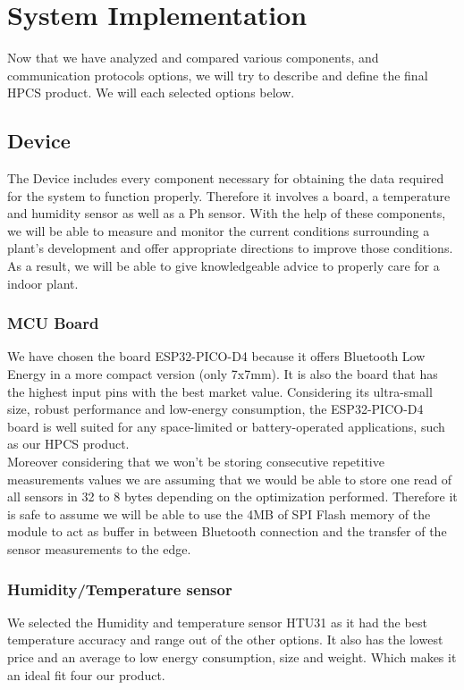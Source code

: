 \section{System Implementation}
Now that we have analyzed and compared various components, and communication protocols options, we will try to describe and define the final HPCS product. We will each selected options below.
\subsection{Device}
The Device includes every component necessary for obtaining the data required for the system to function properly.
Therefore it involves a board, a temperature and humidity sensor as well as a Ph sensor. With the help of these components, we will be able to measure and monitor the current conditions surrounding a plant's development and offer appropriate directions to improve those conditions. As a result, we will be able to give knowledgeable advice to properly care for a indoor plant.
\subsubsection{MCU Board}
We have chosen the board ESP32-PICO-D4 because it offers Bluetooth Low Energy in a more compact version (only 7x7mm). It is also the board that has the highest input pins with the best market value.
Considering its ultra-small size, robust performance and low-energy consumption, the ESP32-PICO-D4 board is well suited for any space-limited or battery-operated applications, such as our HPCS product\cite{b8}.\\
Moreover considering that we won't be storing consecutive repetitive measurements values we are assuming that we would be able to store one read of all sensors in 32 to 8 bytes depending on the optimization performed. Therefore it is safe to assume we will be able to use the 4MB of SPI Flash memory \cite{b9} of the module to act as buffer in between Bluetooth connection and the transfer of the sensor measurements to the edge.

\subsubsection{Humidity/Temperature sensor}
We selected the Humidity and temperature sensor HTU31 as it had the best temperature accuracy and range out of the other options. It also has the lowest price and an average to low energy consumption, size and weight. Which makes it an ideal fit four our product.  
